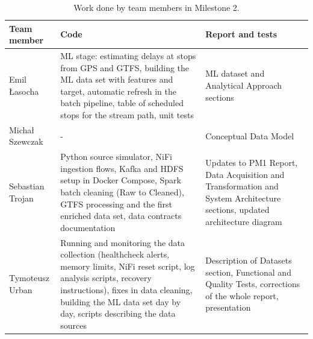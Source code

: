\documentclass[11pt]{article}
\begin{document}
\begin{table}[H]
\centering
\small
\caption{Work done by team members in Milestone 2.}\label{tab:responsibilities}
\begin{tabular}{|>{\raggedright\arraybackslash}p{2.2cm}|>{\raggedright\arraybackslash}p{6.6cm}|>{\raggedright\arraybackslash}p{4.6cm}|}
\hline
\textbf{Team member} & \textbf{Code} & \textbf{Report and tests} \\
\hline
Emil Łasocha & ML stage: estimating delays at stops from GPS and GTFS, building the ML data set with features and target, automatic refresh in the batch pipeline, table of scheduled stops for the stream path, unit tests & ML dataset and Analytical Approach sections \\
\hline
Michał Szewczak & - & Conceptual Data Model \\
\hline
Sebastian Trojan & Python source simulator, NiFi ingestion flows, Kafka and HDFS setup in Docker Compose, Spark batch cleaning (Raw to Cleaned), GTFS processing and the first enriched data set, data contracts documentation & Updates to PM1 Report, Data Acquisition and Transformation and System Architecture sections, updated architecture diagram \\
\hline
Tymoteusz Urban & Running and monitoring the data collection (healthcheck alerts, memory limits, NiFi reset script, log analysis scripts, recovery instructions), fixes in data cleaning, building the ML data set day by day, scripts describing the data sources & Description of Datasets section, Functional and Quality Tests, corrections of the whole report, presentation \\
\hline
\end{tabular}
\end{table}
\end{document}
